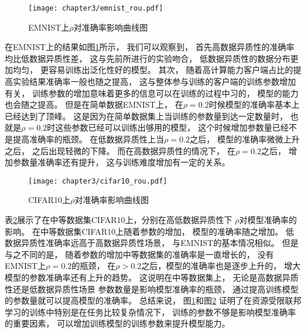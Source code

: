 \begin{figure}[thbp]
    \centering
    \texttt{[image: chapter3/emnist\_rou.pdf]}
    \caption{\label{fig:3-4-emnist-rou}EMNIST上$\rho$对准确率影响曲线图}
\end{figure}
在EMNIST上的结果如图\ref{fig:3-4-emnist-rou}所示，
我们可以观察到，
首先高数据异质性的准确率均比低数据异质性差，
这与先前所进行的实验吻合，
低数据异质性的数据分布更加均匀，
更容易训练出泛化性好的模型。
其次，
随着高计算能力客户端占比的提高实验结果准确率一般也随之提高，
这与整体参与训练的客户端的训练参数增加有关，
训练参数的增加意味着更多的信息可以在训练的过程中习的，
模型的能力也会随之提高。
但是在简单数据EMNIST上，
在$\rho = 0.2$时候模型的准确率基本上已经达到了顶峰。
这是因为在简单数据集上当训练的参数量到达一定数量时，
也就是$\rho=0.2$时这些参数已经可以训练出够用的模型，
这个时候增加参数量已经不是提高准确率的瓶颈。
在低数据异质性上当$\rho = 0.2$之后，
模型的准确率微微上升之后，
之后出现轻微的下降。
而在高数据异质性的情况下，
在$\rho=0.2$之后，
增加参数量准确率还有提升，
这与训练难度增加有一定的关系。

\begin{figure}[thbp]
    \centering
    \texttt{[image: chapter3/cifar10\_rou.pdf]}
    \caption{\label{fig:3-4-cifar-rou}CIFAR10上$\rho$对准确率影响曲线图}
\end{figure}
表\ref{fig:3-4-cifar-rou}展示了在中等数据集CIFAR10上，分别在高低数据异质性下
$\rho$对模型准确率的影响。
在中等数据集CIFAR10上随着参数的增加，
模型的准确率随之增加。
低数据异质性准确率远高于高数据异质性场景，
与EMNIST的基本情况相似。
但是与之不同的是，
随着参数的增加中等数据集的准确率是一直增长的，
没有EMNIST上$\rho=0.2$的瓶颈，
在$\rho > 0.2$之后，模型的准确率也是逐步上升的，
增大模型的参数准确率还有上升的趋势。
这说明在中等数据集上，
无论是高数据异质性还是低数据异质性场景
参数数量是影响模型准确率的瓶颈，
通过提高训练模型的参数量就可以提高模型的准确率。
总结来说，
图\ref{fig:3-4-emnist-rou}和图\ref{fig:3-4-cifar-rou}
证明了在资源受限联邦学习的训练中特别是在任务比较复杂情况下，
训练的参数不够是影响模型准确率的重要因素，
可以增加训练模型的训练参数来提升模型能力。


